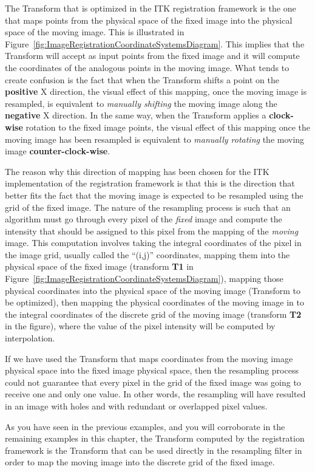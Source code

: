 The Transform that is optimized in the ITK registration framework is the one
that maps points from the physical space of the fixed image into the physical
space of the moving image. This is illustrated in
Figure~\ref{fig:ImageRegistrationCoordinateSystemsDiagram}. This implies that
the Transform will accept as input points from the fixed image and it will
compute the coordinates of the analogous points in the moving image. What tends
to create confusion is the fact that when the Transform shifts a point on the
\textbf{positive} X direction, the visual effect of this mapping, once the
moving image is resampled, is equivalent to {\em manually shifting} the moving
image along the \textbf{negative} X direction. In the same way, when the
Transform applies a \textbf{clock-wise} rotation to the fixed image points, the
visual effect of this mapping once the moving image has been resampled is
equivalent to {\em manually rotating} the moving image
\textbf{counter-clock-wise}. 

The reason why this direction of mapping has been chosen for the ITK
implementation of the registration framework is that this is the direction that
better fits the fact that the moving image is expected to be resampled using
the grid of the fixed image. The nature of the resampling process is such that
an algorithm must go through every pixel of the {\em fixed} image and compute
the intensity that should be assigned to this pixel from the mapping of the
{\em moving} image. This computation involves taking the integral coordinates
of the pixel in the image grid, usually called the ``(i,j)'' coordinates,
mapping them into the physical space of the fixed image (transform \textbf{T1}
in Figure~\ref{fig:ImageRegistrationCoordinateSystemsDiagram}), mapping those
physical coordinates into the physical space of the moving image (Transform to
be optimized), then mapping the physical coordinates of the moving image in to
the integral coordinates of the discrete grid of the moving image (transform
\textbf{T2} in the figure), where the value of the pixel intensity will be
computed by interpolation. 

If we have used the Transform that maps coordinates from the moving image
physical space into the fixed image physical space, then the resampling process
could not guarantee that every pixel in the grid of the fixed image was going
to receive one and only one value. In other words, the resampling will have
resulted in an image with holes and with redundant or overlapped pixel values.

As you have seen in the previous examples, and you will corroborate in the
remaining examples in this chapter, the Transform computed by the registration
framework is the Transform that can be used directly in the resampling filter
in order to map the moving image into the discrete grid of the fixed image.

